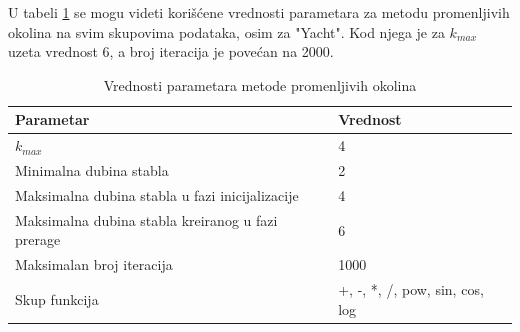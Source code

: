 \documentclass[main.tex]{subfiles}
\begin{document}
U tabeli \ref{tbl:vnpParameters} se mogu videti korišćene vrednosti parametara za metodu promenljivih okolina na svim skupovima podataka, osim za "Yacht". Kod njega je za $k_{max}$ uzeta vrednost 6, a broj iteracija je povećan na 2000.


\begin{table}[H]
\caption{Vrednosti parametara metode promenljivih okolina} 
\label{tbl:vnpParameters}
\centering
\begin{tabular}{l l} %
\hline 
Parametar & Vrednost \\ [0.5ex] 
\hline 
$k_{max}$ & 4  \\ 
Minimalna dubina stabla & 2 \\
Maksimalna dubina stabla u fazi inicijalizacije & 4 \\
Maksimalna dubina stabla kreiranog u fazi prerage  & 6 \\
Maksimalan broj iteracija & 1000 \\ 
Skup funkcija &  +, -, *, /, pow, sin, cos, log \\ [1ex] %
\hline 
\end{tabular}
\end{table}
\clearpage
\end{document}
